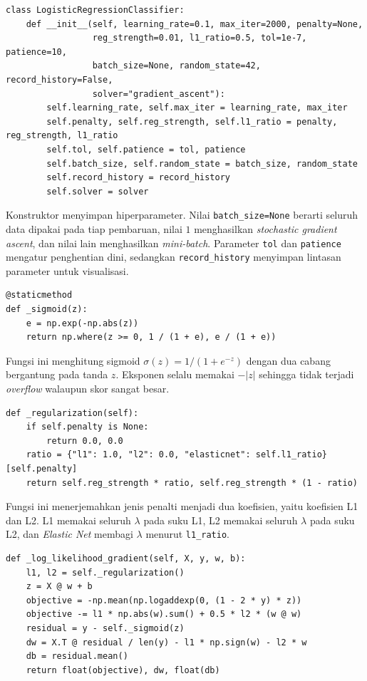 \begin{lstlisting}
class LogisticRegressionClassifier:
    def __init__(self, learning_rate=0.1, max_iter=2000, penalty=None,
                 reg_strength=0.01, l1_ratio=0.5, tol=1e-7, patience=10,
                 batch_size=None, random_state=42, record_history=False,
                 solver="gradient_ascent"):
        self.learning_rate, self.max_iter = learning_rate, max_iter
        self.penalty, self.reg_strength, self.l1_ratio = penalty, reg_strength, l1_ratio
        self.tol, self.patience = tol, patience
        self.batch_size, self.random_state = batch_size, random_state
        self.record_history = record_history
        self.solver = solver
\end{lstlisting}

Konstruktor menyimpan hiperparameter. Nilai \texttt{batch\_size=None} berarti
seluruh data dipakai pada tiap pembaruan, nilai $1$ menghasilkan
\textit{stochastic gradient ascent}, dan nilai lain menghasilkan
\textit{mini-batch}. Parameter \texttt{tol} dan \texttt{patience} mengatur
penghentian dini, sedangkan \texttt{record\_history} menyimpan lintasan
parameter untuk visualisasi.

\begin{lstlisting}
@staticmethod
def _sigmoid(z):
    e = np.exp(-np.abs(z))
    return np.where(z >= 0, 1 / (1 + e), e / (1 + e))
\end{lstlisting}

Fungsi ini menghitung sigmoid $\sigma(z)=1/(1+e^{-z})$ dengan dua cabang
bergantung pada tanda $z$. Eksponen selalu memakai $-|z|$ sehingga tidak
terjadi \textit{overflow} walaupun skor sangat besar.

\begin{lstlisting}
def _regularization(self):
    if self.penalty is None:
        return 0.0, 0.0
    ratio = {"l1": 1.0, "l2": 0.0, "elasticnet": self.l1_ratio}[self.penalty]
    return self.reg_strength * ratio, self.reg_strength * (1 - ratio)
\end{lstlisting}

Fungsi ini menerjemahkan jenis penalti menjadi dua koefisien, yaitu koefisien
L1 dan L2. L1 memakai seluruh $\lambda$ pada suku L1, L2 memakai seluruh
$\lambda$ pada suku L2, dan \textit{Elastic Net} membagi $\lambda$ menurut
\texttt{l1\_ratio}.

\begin{lstlisting}
def _log_likelihood_gradient(self, X, y, w, b):
    l1, l2 = self._regularization()
    z = X @ w + b
    objective = -np.mean(np.logaddexp(0, (1 - 2 * y) * z))
    objective -= l1 * np.abs(w).sum() + 0.5 * l2 * (w @ w)
    residual = y - self._sigmoid(z)
    dw = X.T @ residual / len(y) - l1 * np.sign(w) - l2 * w
    db = residual.mean()
    return float(objective), dw, float(db)
\end{lstlisting}

